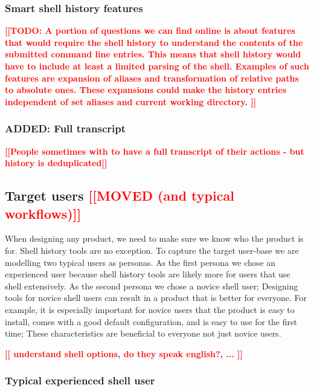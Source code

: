 \documentclass[thesis=M,english]{FITthesis}[2012/10/20]
\newcommand{\todotext}[1]{\textcolor{red}{\textbf{[[#1]]}}}
\newcommand{\redtext}[1]{\textcolor{red}{[[#1]]}}
\begin{document}
\subsubsection*{Smart shell history features}

\todotext{TODO: A portion of questions we can find online is about features that would require the shell history to understand the contents of the submitted command line entries. This means that shell history would have to include at least a limited parsing of the shell. Examples of such features are expansion of aliases and transformation of relative paths to absolute ones. These expansions could make the history entries independent of set aliases and current working directory. }

\subsubsection*{ADDED: Full transcript}
\todotext{People sometimes with to have a full transcript of their actions - but history is deduplicated}


\subsection{Target users \redtext{MOVED (and typical workflows)} }

When designing any product, we need to make sure we know who the product is for. Shell history tools are no exception. To capture the target user-base we are modelling two typical users as personas. As the first persona we chose an experienced user because shell history tools are likely more for users that use shell extensively. As the second persona we chose a novice shell user; Designing tools for novice shell users can result in a product that is better for everyone. For example, it is especially important for novice users that the product is easy to install, comes with a good default configuration, and is easy to use for the first time; These characteristics are beneficial to everyone not just novice users. 

\todotext{ understand shell options, do they speak english?, ... }


\subsubsection*{Typical experienced shell user}
\end{document}

